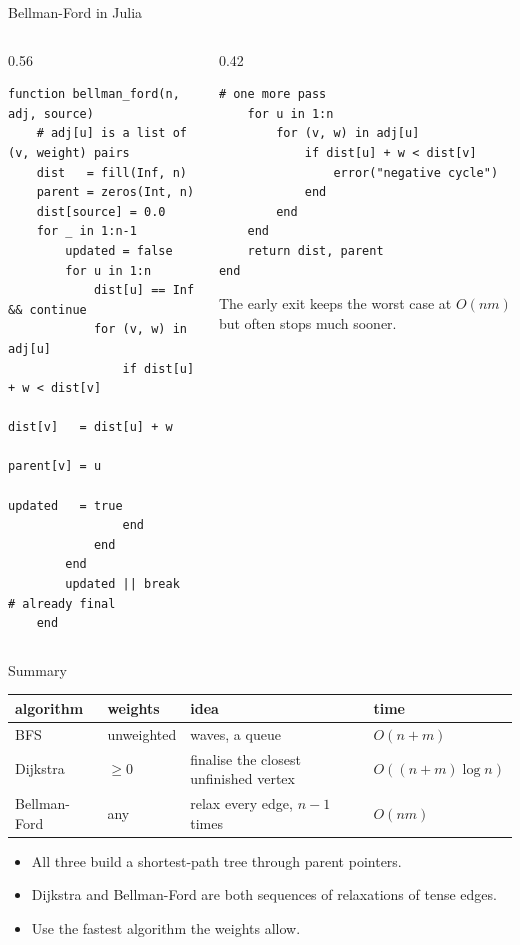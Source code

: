 \documentclass[10pt,aspectratio=169]{beamer}
\begin{document}
\begin{frame}[fragile]{Bellman-Ford in Julia}
  \begin{columns}[T]
    \begin{column}{0.56\textwidth}
\begin{lstlisting}[basicstyle=\ttfamily\scriptsize]
function bellman_ford(n, adj, source)
    # adj[u] is a list of (v, weight) pairs
    dist   = fill(Inf, n)
    parent = zeros(Int, n)
    dist[source] = 0.0
    for _ in 1:n-1
        updated = false
        for u in 1:n
            dist[u] == Inf && continue
            for (v, w) in adj[u]
                if dist[u] + w < dist[v]
                    dist[v]   = dist[u] + w
                    parent[v] = u
                    updated   = true
                end
            end
        end
        updated || break   # already final
    end
\end{lstlisting}
    \end{column}
    \begin{column}{0.42\textwidth}
\begin{lstlisting}[basicstyle=\ttfamily\scriptsize]
    # one more pass
    for u in 1:n
        for (v, w) in adj[u]
            if dist[u] + w < dist[v]
                error("negative cycle")
            end
        end
    end
    return dist, parent
end
\end{lstlisting}

      \bigskip
      \small The early exit keeps the worst case at $O(nm)$ but often stops
      much sooner.
    \end{column}
  \end{columns}
\end{frame}

\begin{frame}{Summary}
  \begin{center}
  \begin{tabular}{llll}
    \toprule
    algorithm & weights & idea & time \\
    \midrule
    BFS & unweighted & waves, a queue & $O(n + m)$ \\
    Dijkstra & $\ge 0$ & finalise the closest unfinished vertex
             & $O((n + m) \log n)$ \\
    Bellman-Ford & any & relax every edge, $n - 1$ times & $O(nm)$ \\
    \bottomrule
  \end{tabular}
  \end{center}

  \bigskip
  \begin{itemize}
    \item All three build a shortest-path tree through parent pointers.
    \item Dijkstra and Bellman-Ford are both sequences of relaxations of tense
          edges.
    \item Use the fastest algorithm the weights allow.
  \end{itemize}
\end{frame}
\end{document}
